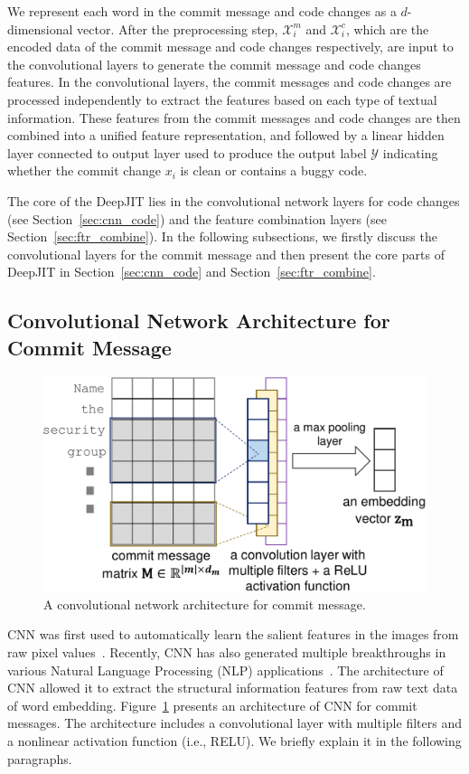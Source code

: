 We represent each word in the commit message and code changes as a $d$-dimensional vector. After the preprocessing step,  $\mathcal{X}^{m}_i$ and $\mathcal{X}^{c}_i$, which are the encoded data of the commit message and code changes respectively, are input to the convolutional layers to generate the commit message and code changes features. In the convolutional layers, the commit messages and code changes are processed independently to extract the features based on each type of textual information. These features from the commit messages and code changes are then combined into a unified feature representation, and followed by a linear hidden layer connected to output layer used to produce the output label $\mathcal{Y}$ indicating whether the commit change $x_i$ is clean or contains a buggy code. 

The core of the DeepJIT lies in the convolutional network layers for code changes (see Section~\ref{sec:cnn_code}) and the feature combination layers (see Section~\ref{sec:ftr_combine}). In the following subsections, we firstly discuss the convolutional layers for the commit message and then present the core parts of DeepJIT in Section~\ref{sec:cnn_code} and Section~\ref{sec:ftr_combine}. 

\subsection{Convolutional Network Architecture for Commit Message}
\label{sec:cnn_msg}
\begin{figure}
\center
\includegraphics[scale=0.45]{figs/msg.pdf}
\caption{A convolutional network architecture for commit message.}
\label{fig:msg}
\end{figure}
CNN was first used to automatically learn the salient features in the images from raw pixel values~\cite{krizhevsky2012imagenet}. Recently, CNN has also generated multiple breakthroughs in various Natural Language Processing (NLP) applications~\cite{kim2014convolutional, dos2014deep, kalchbrenner2014convolutional, zhang2015character, johnson2014effective}. The architecture of CNN allowed it to extract the structural information features from raw text data of word embedding. Figure~\ref{fig:msg} presents an architecture of CNN for commit messages. The architecture includes a convolutional layer with multiple filters and a nonlinear activation function (i.e., RELU). We briefly explain it in the following paragraphs. 

